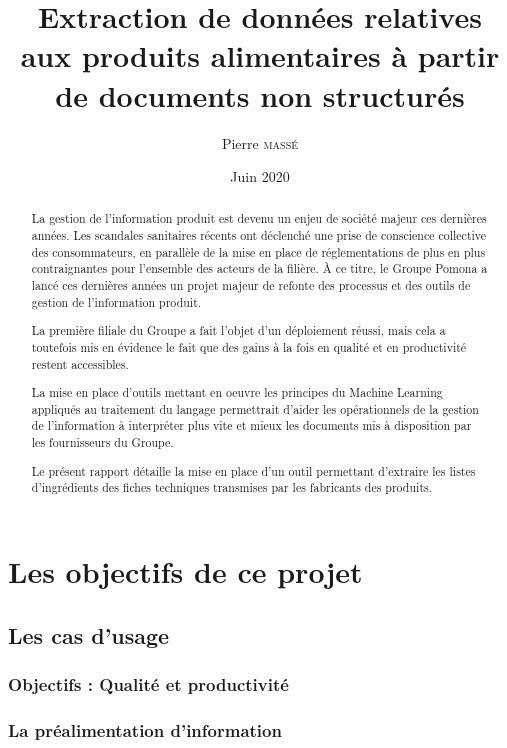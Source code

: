 \documentclass{report}
\title{Extraction de données relatives aux produits alimentaires à partir de documents non structurés}
\author{Pierre \textsc{massé}}
\date{Juin 2020}
\begin{document}
\maketitle

\large
\begin{abstract}
    {\em
    
    La gestion de l'information produit est devenu un enjeu de société majeur ces dernières années.
    Les scandales sanitaires récents ont déclenché une prise de conscience collective des consommateurs, en parallèle de la mise en place de réglementations de plus en plus contraignantes pour l'ensemble des acteurs de la filière\cite{incotext}\cite{incoexpl}.
    \`{A} ce titre, le Groupe Pomona a lancé ces dernières années un projet majeur de refonte des processus et des outils de gestion de l'information produit.

    La première filiale du Groupe a fait l'objet d'un déploiement réussi, mais cela a toutefois mis en évidence le fait que des gains à la fois en qualité et en productivité restent accessibles.

    La mise en place d'outils mettant en oeuvre les principes du Machine Learning appliqués au traitement du langage permettrait d'aider les opérationnels de la gestion de l'information à interpréter plus vite et mieux les documents mis à disposition par les fournisseurs du Groupe.

    Le présent rapport détaille la mise en place d'un outil permettant d'extraire les listes d'ingrédients des fiches techniques transmises par les fabricants des produits.
    }
\end{abstract}
\normalsize

\tableofcontents





\part{Les objectifs de ce projet}
    \chapter{Les cas d'usage}
        \section{Objectifs : Qualité et productivité}
        \section{La préalimentation d'information}
\end{document}
